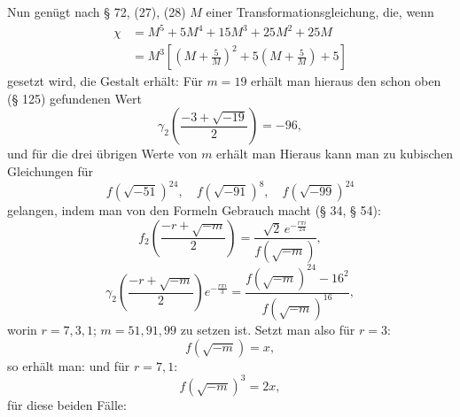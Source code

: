 
Nun genügt nach § 72, (27), (28) $M$ einer Transformationsgleichung, die, wenn
\[
\begin{aligned}
\chi &= M^5 + 5M^4 + 15M^3 + 25M^2 + 25M\\
&= M^3\left[\left(M + \frac{5}{M}\right)^2 + 5\left(M + \frac{5}{M}\right) + 5\right]
\end{aligned}
\]
gesetzt wird, die Gestalt erhält:
Für $m = 19$ erhält man hieraus den schon oben (§ 125) gefundenen Wert
\[\gamma_2\left(\frac{-3+\sqrt{-19}}{2}\right) = -96,\]
und für die drei übrigen Werte von $m$ erhält man
Hieraus kann man zu kubischen Gleichungen für
\[f\left(\sqrt{-51}\right)^{24}, \quad f\left(\sqrt{-91}\right)^{8}, \quad f\left(\sqrt{-99}\right)^{24}\]
gelangen, indem man von den Formeln Gebrauch macht (§ 34, § 54):
\[f_2\left(\frac{-r+\sqrt{-m}}{2}\right) = \frac{\sqrt{2}\, e^{-\frac{r\pi i}{24}}}{f(\sqrt{-m})},\]
\[\gamma_2\left(\frac{-r+\sqrt{-m}}{2}\right) e^{-\frac{r\pi i}{3}} = \frac{f(\sqrt{-m})^{24} - 16^2}{f(\sqrt{-m})^{16}},\]
worin $r = 7, 3, 1$; $m = 51, 91, 99$ zu setzen ist. Setzt man also für $r = 3$:
\[f(\sqrt{-m}) = x,\]
so erhält man:
und für $r = 7, 1$:
\[f(\sqrt{-m})^3 = 2x,\]
für diese beiden Fälle:
